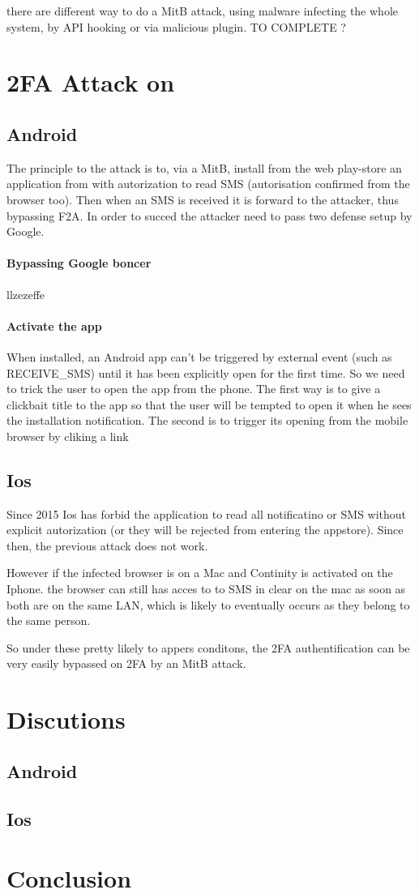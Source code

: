 \documentclass[11pt]{article}
\begin{document}
there are different way to do a MitB attack, using malware infecting the whole 
system, by API hooking or via malicious plugin. TO COMPLETE ?
\section{2FA Attack on }
\subsection{Android}
The principle to the attack is to, via a MitB, install from the web play-store an
application from with autorization to read SMS (autorisation confirmed from the browser 
too). Then when an SMS is received it is forward to the attacker, thus bypassing 
F2A. In order to succed the attacker need to pass two defense setup by Google.

\paragraph{Bypassing Google boncer} llzezeffe

\paragraph{Activate the app} When installed, an Android app can't be triggered 
by external event (such as RECEIVE\_SMS) until it has been explicitly open for 
the first time. So we need to trick the user to open the app from the phone. The 
first way is to give a clickbait title to the app so that the user will be 
tempted to open it when he sees the installation notification.
The second is to trigger its opening from the mobile browser by cliking a link

\subsection{Ios}
Since 2015 Ios has forbid the application to read all 
notificatino or SMS without explicit autorization (or they will be rejected from entering the appstore). 
Since then, the previous attack does not work. 

However if the infected browser is on a Mac and Continity 
is activated on the Iphone. the browser can still has acces to to SMS in clear 
on the mac as soon as both are on the same LAN, which is likely to eventually occurs
as they belong to the same person. 

So under these pretty likely to appers conditons, the 2FA authentification can 
be very easily bypassed on 2FA by an MitB attack.


\section{Discutions} 
\subsection{Android}
\subsection{Ios}
\section{Conclusion}

% 
%
\end{document}
